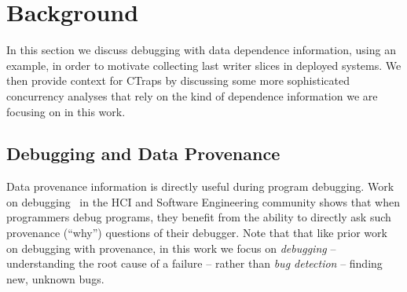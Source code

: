 \documentclass[preprint,9pt]{sigplanconf}
\newcommand{\ctraps}{CTraps\xspace}
\begin{document}


\section{Background}

In this section we discuss debugging with data dependence information, using an
example, in order to motivate collecting last writer slices in deployed
systems.  We then provide context for \ctraps by discussing some more
sophisticated concurrency analyses that rely on the kind of dependence
information we are focusing on in this work.


\subsection{Debugging and Data Provenance}

Data provenance information is directly useful during program debugging.  Work
on debugging~\cite{whylinechi,whylineicse} in the HCI and Software Engineering
community shows that when programmers debug programs, they benefit from the
ability to directly ask such provenance (``why'') questions of their debugger.
Note that that like prior work on debugging with provenance, in this work we
focus on {\em debugging} -- understanding the root cause of a failure -- rather than {\em bug detection} -- finding new, unknown bugs.
\end{document}
